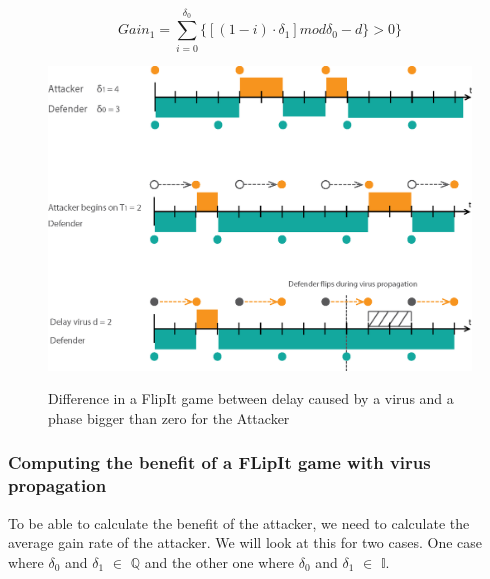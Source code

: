 \begin{equation}\label{first}
Gain_{1} = \sum_{i=0}^{\delta_{0}} \lbrace [( 1 - i ) \cdot \delta_{1}] mod \delta_{0} - d \rbrace  > 0 \rbrace 
\end{equation}

\begin{figure}[hbtp]
\caption{Difference in a FlipIt game between delay caused by a virus and a phase bigger than zero for the Attacker}
\centering
\includegraphics[scale=1]{Images/Flipvirus}
\label{fig:virusflip}
\end{figure}


\subsubsection{Computing the benefit of a FLipIt game with virus propagation}

To be able to calculate the benefit of the attacker, we need to calculate the average gain rate of the attacker. We will look at this for two cases. One case where $\delta_{0}$ and $\delta_{1}$ $\in$ \(\mathbb{Q}\) and the other one where $\delta_{0}$ and $\delta_{1}$ $\in$ \(\mathbb{I}.\) \\

